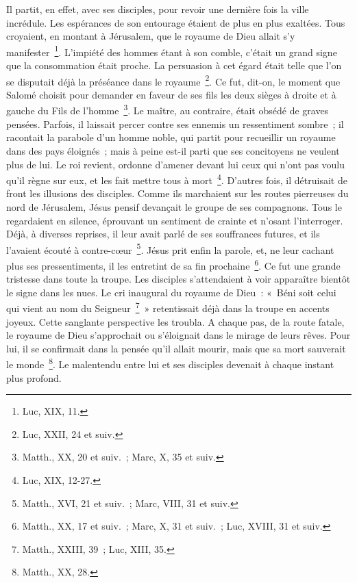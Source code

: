 \documentclass[french,twoside]{book} %
\newcommand\chaptercont{} %
\begin{document}
\chaptercont
\noindent Il partit, en effet, avec ses disciples, pour revoir une dernière fois la ville incrédule. Les espérances de son entourage étaient de plus en plus exaltées. Tous croyaient, en montant à Jérusalem, que le royaume de Dieu allait s’y manifester \footnote{Luc, XIX, 11.}. L’impiété des hommes étant à son comble, c’était un grand signe que la consommation était proche. La persuasion à cet égard était telle que l’on se disputait déjà la préséance dans le royaume \footnote{Luc, XXII, 24 et suiv.}. Ce fut, dit-on, le moment que Salomé choisit pour demander en faveur de ses fils les deux sièges à droite et à gauche du Fils de l’homme \footnote{Matth., XX, 20 et suiv. ; Marc, X, 35 et suiv.}. Le maître, au contraire, était obsédé de graves pensées. Parfois, il laissait percer contre ses ennemis un ressentiment sombre ; il racontait la parabole d’un homme noble, qui partit pour recueillir un royaume dans des pays éloignés ; mais à peine est-il parti que ses concitoyens ne veulent plus de lui. Le roi revient, ordonne d’amener devant lui ceux qui n’ont pas voulu qu’il règne sur eux, et les fait mettre tous à mort \footnote{Luc, XIX, 12-27.}. D’autres fois, il détruisait de front les illusions des disciples. Comme ils marchaient sur les routes pierreuses du nord de Jérusalem, Jésus pensif devançait le groupe de ses compagnons. Tous le regardaient en silence, éprouvant un sentiment de crainte et n’osant l’interroger. Déjà, à diverses reprises, il leur avait parlé de ses souffrances futures, et ils l’avaient écouté à contre-cœur \footnote{Matth., XVI, 21 et suiv. ; Marc, VIII, 31 et suiv.}. Jésus prit enfin la parole, et, ne leur cachant plus ses pressentiments, il les entretint de sa fin prochaine \footnote{Matth., XX, 17 et suiv. ; Marc, X, 31 et suiv. ; Luc, XVIII, 31 et suiv.}. Ce fut une grande tristesse dans toute la troupe. Les disciples s’attendaient à voir apparaître bientôt le signe dans les nues. Le cri inaugural du royaume de Dieu : « Béni soit celui qui vient au nom du Seigneur \footnote{Matth., XXIII, 39 ; Luc, XIII, 35.} » retentissait déjà dans la troupe en accents joyeux. Cette sanglante perspective les troubla. A chaque pas, de la route fatale, le royaume de Dieu s’approchait ou s’éloignait dans le mirage de leurs rêves. Pour lui, il se confirmait dans la pensée qu’il allait mourir, mais que sa mort sauverait le monde \footnote{Matth., XX, 28.}. Le malentendu entre lui et ses disciples devenait à chaque instant plus profond.\par
\end{document}
